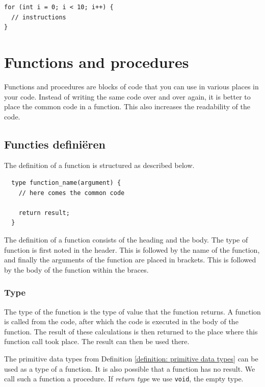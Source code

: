 \documentclass[11pt,fleqn]{book} %
\begin{document}
\begin{example}
	\phantom{ }
	\begin{verbatim}
for (int i = 0; i < 10; i++) {
  // instructions
}
	\end{verbatim}
\end{example}

\chapter{Functions and procedures}
Functions and procedures are blocks of code that you can use in various places in your code. Instead of writing the same code over and over again, it is better to place the common code in a function. This also increases the readability of the code.

\section{Functies definiëren}
The definition of a function is structured as described below.
\begin{definition}[Function]
	\phantom{ }
	\begin{verbatim}
  type function_name(argument) {
    // here comes the common code

    return result;
  }
	\end{verbatim}
	\vspace{0cm}
\end{definition}
\noindent
The definition of a function consists of the heading and the body. The type of function is first noted in the header. This is followed by the name of the function, and finally the arguments of the function are placed in brackets. This is followed by the body of the function within the braces.

\subsection{Type}
The type of the function is the type of value that the function returns. A function is called from the code, after which the code is executed in the body of the function. The result of these calculations is then returned to the place where this function call took place. The result can then be used there.

The primitive data types from Definition \ref{definition: primitive data types} can be used as a type of a function. It is also possible that a function has no result. We call such a function a procedure. If \emph{return type} we use \texttt{void}, the empty type.
\end{document}
